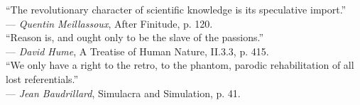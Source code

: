 
\begin{dedication}``The revolutionary character of scientific knowledge is its speculative import.'' \\
	--- \emph{Quentin Meillassoux}, After Finitude, p. 120. \\
	\vspace{1cm}
	``Reason is, and ought only to be the slave of the passions.'' \\
	--- \emph{David Hume}, A Treatise of Human Nature, II.3.3, p. 415. \\
	\vspace{1cm}
	``We only have a right to the retro, to the phantom, parodic rehabilitation of all lost referentials.'' \\
	--- \emph{Jean Baudrillard}, Simulacra and Simulation, p. 41.
\end{dedication}

